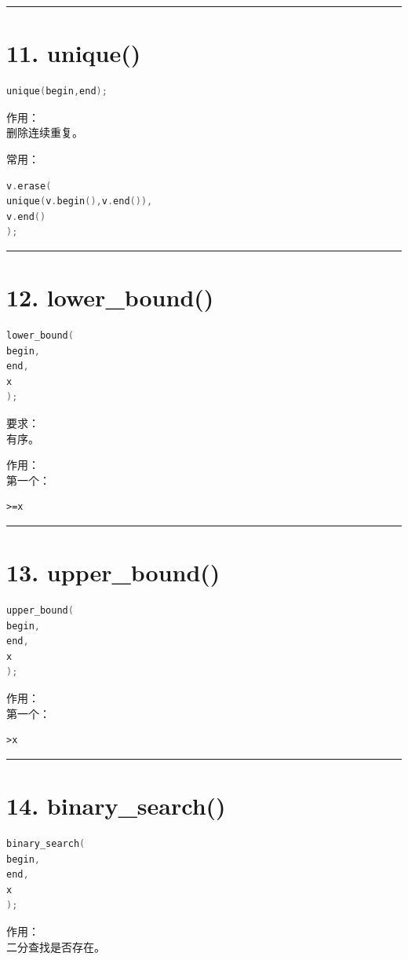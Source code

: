 \documentclass[10pt,twocolumn]{extarticle}
\begin{document}
\noindent\rule{\linewidth}{0.4pt}

\section{11. unique()}
\begin{lstlisting}[language=C++]
unique(begin,end);
\end{lstlisting}
作用：\\
删除连续重复。

常用：
\begin{lstlisting}[language=C++]
v.erase(
unique(v.begin(),v.end()),
v.end()
);
\end{lstlisting}

\noindent\rule{\linewidth}{0.4pt}

\section{12. lower\_bound()}
\begin{lstlisting}[language=C++]
lower_bound(
begin,
end,
x
);
\end{lstlisting}
要求：\\
有序。

作用：\\
第一个：
\begin{lstlisting}
>=x
\end{lstlisting}

\noindent\rule{\linewidth}{0.4pt}

\section{13. upper\_bound()}
\begin{lstlisting}[language=C++]
upper_bound(
begin,
end,
x
);
\end{lstlisting}
作用：\\
第一个：
\begin{lstlisting}
>x
\end{lstlisting}

\noindent\rule{\linewidth}{0.4pt}

\section{14. binary\_search()}
\begin{lstlisting}[language=C++]
binary_search(
begin,
end,
x
);
\end{lstlisting}
作用：\\
二分查找是否存在。
\end{document}
